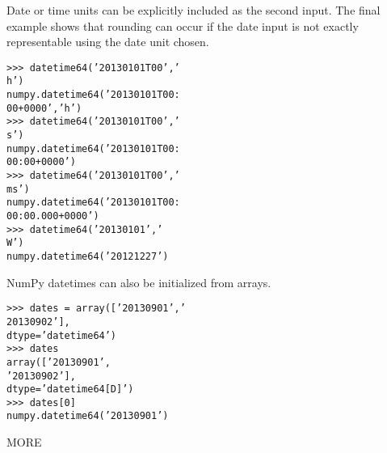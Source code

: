 \documentclass[KSmain.tex]{subfiles}
\begin{document}
Date or time units can be explicitly included as the second input. The final example shows that rounding
can occur if the date input is not exactly representable using the date unit chosen.
\begin{framed}
\begin{verbatim}
>>> datetime64(’20130101T00’,’
h’)
numpy.datetime64(’20130101T00:
00+0000’,’h’)
>>> datetime64(’20130101T00’,’
s’)
numpy.datetime64(’20130101T00:
00:00+0000’)
>>> datetime64(’20130101T00’,’
ms’)
numpy.datetime64(’20130101T00:
00:00.000+0000’)
>>> datetime64(’20130101’,’
W’)
numpy.datetime64(’20121227’)
\end{verbatim}
\end{framed}

NumPy datetimes can also be initialized from arrays.
\begin{framed}
\begin{verbatim}
>>> dates = array([’20130901’,’
20130902’],
dtype=’datetime64’)
>>> dates
array([’20130901’,
’20130902’],
dtype=’datetime64[D]’)
>>> dates[0]
numpy.datetime64(’20130901’)
\end{verbatim}
\end{framed}

MORE
\end{document}
